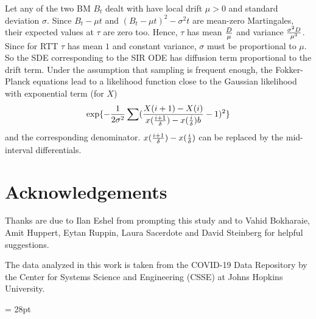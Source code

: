 \documentclass{article}
\begin{document}
\noindent Let any of the two BM $B_t$ dealt with have local drift $\mu>0$ and standard deviation $\sigma$. Since $B_t - \mu t$ and $(B_t - \mu t)^2 - \sigma^2 t$ are mean-zero Martingales, their expected values at $\tau$ are zero too. Hence, $\tau$ has mean ${D \over \mu}$ and variance ${{\sigma^2 D} \over {\mu^3}}$. Since for RTT $\tau$ has mean $1$ and constant variance, $\sigma$ must be proportional to $\mu$. So the SDE corresponding to the SIR ODE has diffusion term proportional to the drift term. Under the assumption that sampling is frequent enough, the Fokker-Planck equations lead to a likelihood function close to the Gaussian likelihood with exponential term (for $X$)
$$
\exp\{-{1 \over {2 \sigma^2}}\sum ({{X(i+1)-X(i)} \over {{x({{i+1} \over \delta})-x({{i} \over \delta})}b}}-1)^2\}
$$
and the corresponding denominator. ${{x({{i+1} \over \delta})-x({{i} \over \delta})}}$ can be replaced by the mid-interval differentials.

\section*{Acknowledgements}

Thanks are due to Ilan Eshel from prompting this study and to Vahid
Bokharaie, Amit Huppert, Eytan Ruppin, Laura Sacerdote and David Steinberg for helpful suggestions.

The data analyzed in this work is taken from the COVID-19 Data Repository by
the Center for Systems Science and Engineering (CSSE) at Johns Hopkins
University.


\baselineskip= 28pt
\end{document}
